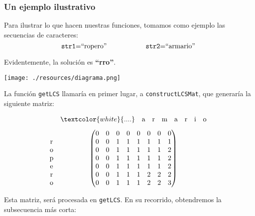 \documentclass[10pt, a4paper]{article}
\theoremstyle{theorem-style}
\theoremstyle{theorem-style}
\theoremstyle{definition-style}
\theoremstyle{remark-style}
\theoremstyle{example-style}
\theoremstyle{definition-style}
\theoremstyle{remark-style}
\begin{document}
\subsubsection{Un ejemplo ilustrativo}

Para ilustrar lo que hacen nuestras funciones, tomamos como ejemplo las secuencias de caracteres:
$$\text{\texttt{str1}=``ropero''\hspace{2cm}\texttt{str2}=``armario''}$$

Evidentemente, la solución es \textbf{``rro''}.

\begin{center}
	\texttt{[image: ./resources/diagrama.png]}
\end{center}

\vspace{0.5cm}
La función \texttt{getLCS} llamaría en primer lugar, a \texttt{constructLCSMat}, que generaría la siguiente matriz:

$$
\begin{matrix}
 & \begin{matrix} \textcolor{white}{....}\vspace{0.3cm}&\text{{a}} & \text{{r}} & \text{{m}} & \text{{a}} & \text{{r}} & \text{{i}} & \text{{o}} \end{matrix} \\
\begin{matrix}\\ \text{{r}}\\\text{{o}}\\\text{{p}}\\\text{{e}}\\\text{{r}}\\\text{{o}} \end{matrix} & \left(\begin{matrix}
0 & 0 & 0 &0&0&0&0&0\\
0&0&1&1&1&1&1&1\\
0&0&1&1&1&1&1&2\\
0&0&1&1&1&1&1&2\\
0&0&1&1&1&1&1&2\\
0&0&1&1&1&2&2&2\\
0&0&1&1&1&2&2&3\\
\end{matrix}\right)
\end{matrix}
$$

Esta matriz, será procesada en \texttt{getLCS}. En su recorrido, obtendremos la subsecuencia más corta:
\end{document}
